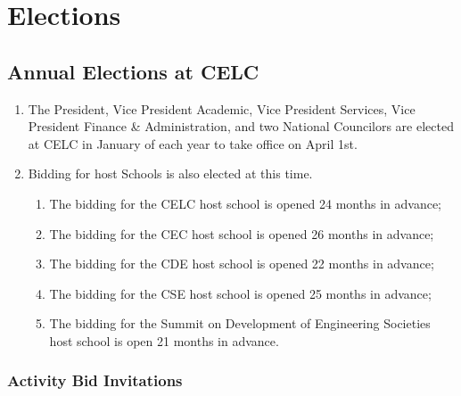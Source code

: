 \section{Elections}
\label{elections}

\subsection{Annual Elections at CELC}
\label{annual-elections-at-celc}

\begin{enumerate}
 \item
  The President, Vice President Academic, Vice President Services, Vice President Finance \& Administration, and two National Councilors are elected at CELC in January of each year to take office on April 1st.
 \item
  Bidding for host Schools is also elected at this time.

  \begin{enumerate}
   \item
    The bidding for the CELC host school is opened 24 months in advance;
   \item
    The bidding for the CEC host school is opened 26 months in advance;
   \item
    The bidding for the CDE host school is opened 22 months in advance;
   \item
    The bidding for the CSE host school is opened 25 months in advance;
   \item
    The bidding for the Summit on Development of Engineering Societies host school is open 21 months in advance.
  \end{enumerate}
\end{enumerate}

\subsubsection{Activity Bid Invitations}
\label{activity-bid-invitations}

